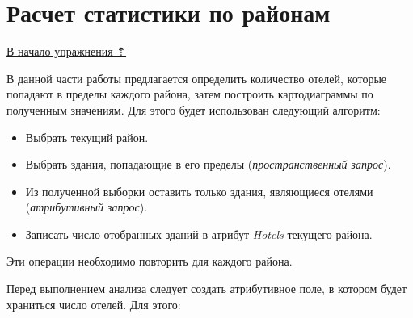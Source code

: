 \documentclass[]{book}
\theoremstyle{definition}
\theoremstyle{definition}
\theoremstyle{definition}
\theoremstyle{remark}
\begin{document}
\hypertarget{map-ref-economic-stats}{%
\section{Расчет статистики по районам}\label{map-ref-economic-stats}}

\protect\hyperlink{map-ref-economic}{В начало упражнения ⇡}

В данной части работы предлагается определить количество отелей, которые
попадают в пределы каждого района, затем построить картодиаграммы по
полученным значениям. Для этого будет использован следующий алгоритм:

\begin{itemize}
\item
  Выбрать текущий район.
\item
  Выбрать здания, попадающие в его пределы (\emph{пространственный
  запрос}).
\item
  Из полученной выборки оставить только здания, являющиеся отелями
  (\emph{атрибутивный запрос}).
\item
  Записать число отобранных зданий в атрибут \emph{Hotels} текущего
  района.
\end{itemize}

Эти операции необходимо повторить для каждого района.

Перед выполнением анализа следует создать атрибутивное поле, в котором
будет храниться число отелей. Для этого:
\end{document}
